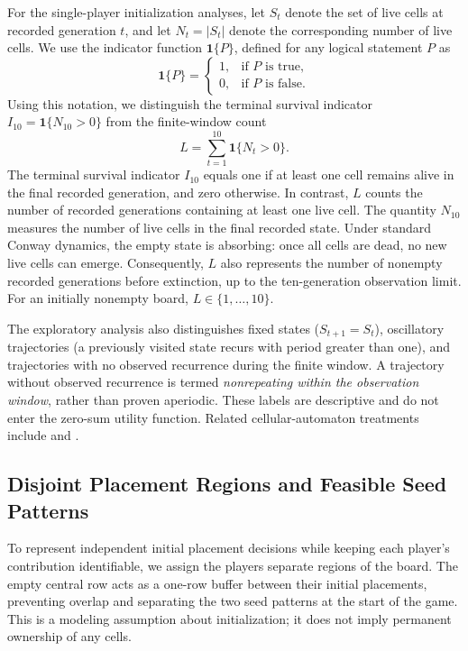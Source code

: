 \documentclass[games,article,submit,moreauthors]{Definitions/mdpi}
\begin{document}
For the single-player initialization analyses, let $S_t$ denote the set of live cells at recorded generation $t$, and let $N_t=|S_t|$ denote the corresponding number of live cells. We use the indicator function $\mathbf{1}\{P\}$, defined for any logical statement $P$ as
\begin{equation}\label{eq:indicator}
\mathbf{1}\{P\}=
\begin{cases}
1, & \text{if }P\text{ is true},\\
0, & \text{if }P\text{ is false}.
\end{cases}
\end{equation}
Using this notation, we distinguish the terminal survival indicator $I_{10}=\mathbf{1}\{N_{10}>0\}$ from the finite-window count
\begin{equation}\label{eq:survival_window}
L=\sum_{t=1}^{10}\mathbf{1}\{N_t>0\}.
\end{equation}
The terminal survival indicator $I_{10}$ equals one if at least one cell remains alive in the final recorded generation, and zero otherwise. In contrast, $L$ counts the number of recorded generations containing at least one live cell. The quantity $N_{10}$ measures the number of live cells in the final recorded state.
Under standard Conway dynamics, the empty state is absorbing: once all cells are dead, no new live cells can emerge. Consequently, $L$ also represents the number of nonempty recorded generations before extinction, up to the ten-generation observation limit. For an initially nonempty board, $L\in\{1,\ldots,10\}$.

The exploratory analysis also distinguishes fixed states ($S_{t+1}=S_t$), oscillatory trajectories (a previously visited state recurs with period greater than one), and trajectories with no observed recurrence during the finite window. A trajectory without observed recurrence is termed \emph{nonrepeating within the observation window}, rather than proven aperiodic. These labels are descriptive and do not enter the zero-sum utility function. Related cellular-automaton treatments include \citet{ilachinski2001cellular} and \citet{adamatzky2010game}.

\subsection{Disjoint Placement Regions and Feasible Seed Patterns}

To represent independent initial placement decisions while keeping each player's contribution identifiable, we assign the players separate regions of the board. The empty central row acts as a one-row buffer between their initial placements, preventing overlap and separating the two seed patterns at the start of the game. This is a modeling assumption about initialization; it does not imply permanent ownership of any cells. 
\end{document}
